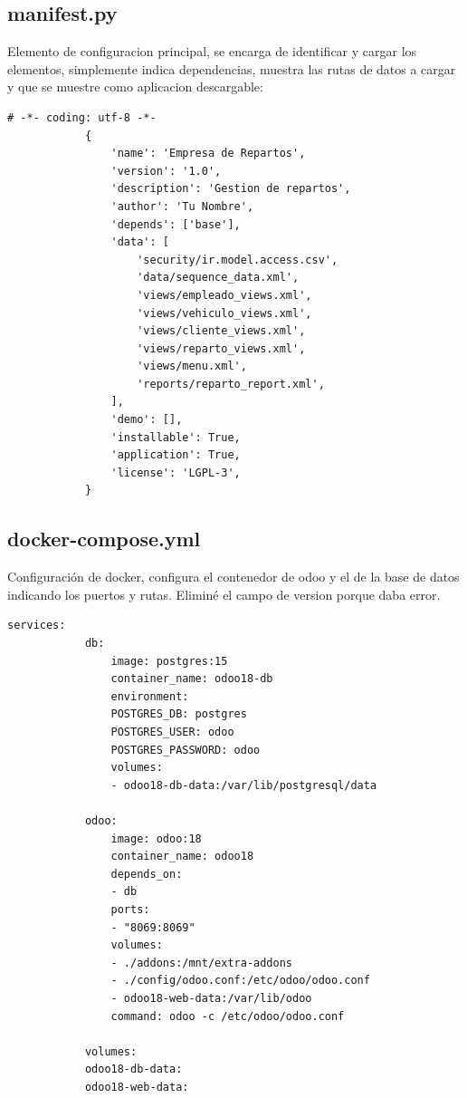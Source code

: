 \documentclass[a4paper, 11pt]{article}
\begin{document}
    \subsection{manifest.py}
        Elemento de configuracion principal, se encarga de identificar y cargar los elementos,
        simplemente indica dependencias, muestra las rutas de datos a cargar y que se muestre como aplicacion descargable:
        \begin{lstlisting}[frame=single,breaklines=true]
            # -*- coding: utf-8 -*-
            {
                'name': 'Empresa de Repartos',
                'version': '1.0',
                'description': 'Gestion de repartos',
                'author': 'Tu Nombre',
                'depends': ['base'],
                'data': [
                    'security/ir.model.access.csv',
                    'data/sequence_data.xml',
                    'views/empleado_views.xml',
                    'views/vehiculo_views.xml',
                    'views/cliente_views.xml',
                    'views/reparto_views.xml',
                    'views/menu.xml',
                    'reports/reparto_report.xml',
                ],
                'demo': [],
                'installable': True,
                'application': True,
                'license': 'LGPL-3',
            }
        \end{lstlisting}

    \subsection{docker-compose.yml}
        Configuración de docker, configura el contenedor de odoo y el de la base de datos indicando los puertos y rutas.
         Eliminé el campo de version porque daba error.

        \begin{lstlisting}[frame=single,breaklines=true]
            services:
            db:
                image: postgres:15
                container_name: odoo18-db
                environment:
                POSTGRES_DB: postgres
                POSTGRES_USER: odoo
                POSTGRES_PASSWORD: odoo
                volumes:
                - odoo18-db-data:/var/lib/postgresql/data

            odoo:
                image: odoo:18
                container_name: odoo18
                depends_on:
                - db
                ports:
                - "8069:8069"
                volumes:
                - ./addons:/mnt/extra-addons
                - ./config/odoo.conf:/etc/odoo/odoo.conf
                - odoo18-web-data:/var/lib/odoo
                command: odoo -c /etc/odoo/odoo.conf

            volumes:
            odoo18-db-data:
            odoo18-web-data:

        \end{lstlisting}
\end{document}
